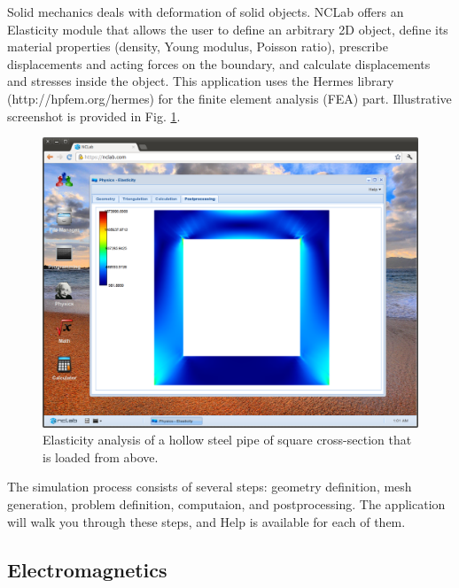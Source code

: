 \documentclass[article,A4,12pt]{llncs}
\begin{document}
Solid mechanics deals with deformation of solid objects. NCLab 
offers an Elasticity module that allows the user to define an
arbitrary 2D object, define its material properties (density, Young modulus, 
Poisson ratio), prescribe displacements and acting forces on the boundary, 
and calculate displacements and stresses inside the object. This application  
uses the Hermes library (http://hpfem.org/hermes) for the finite element 
analysis (FEA) part. Illustrative screenshot is provided in Fig. \ref{fig:elast1}.
\begin{figure}[!ht]
\begin{center}
\includegraphics[width=\textwidth]{img/elast1.png}
\end{center}
\caption{Elasticity analysis of a hollow steel pipe of square cross-section that is loaded from above.}
\label{fig:elast1}
\end{figure}
\newpage
\noindent
The simulation process consists of several steps: geometry definition, 
mesh generation, problem definition, computaion, and postprocessing. 
The application will walk you through these steps, and Help 
is available for each of them.

\subsection{Electromagnetics}
\end{document}
